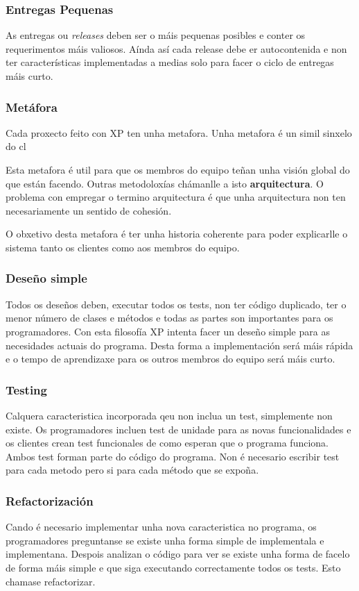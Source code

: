 \subsubsection{Entregas Pequenas}
As entregas ou \emph{releases} deben ser o máis pequenas posibles e conter os requerimentos máis valiosos. Aínda así cada release debe er autocontenida e non ter características implementadas a medias solo para facer o ciclo de entregas máis curto.

\subsubsection{Metáfora}
Cada proxecto feito con XP ten unha metafora. Unha metafora é un simil sinxelo do cl

Esta metafora é util para que os membros do equipo teñan unha visión global do que están facendo. Outras metodoloxías chámanlle a isto \textbf{arquitectura}. O problema con empregar o termino arquitectura é que unha arquitectura non ten necesariamente un sentido de cohesión.

O obxetivo desta metafora é ter unha historia coherente para poder explicarlle o sistema tanto os clientes como aos membros do equipo.

\subsubsection{Deseño simple}
Todos os deseños deben, executar todos os tests, non ter código duplicado, ter o menor número de clases e métodos e todas as partes son importantes para os programadores. Con esta filosofía XP intenta facer un deseño simple para as necesidades actuais do programa. Desta forma a implementación será máis rápida e o tempo de aprendizaxe para os outros membros do equipo será máis curto.

\subsubsection{Testing}
Calquera caracteristica incorporada qeu non inclua un test, simplemente non existe. Os programadores incluen test de unidade para as novas funcionalidades e os clientes crean test funcionales de como esperan que o programa funciona. Ambos test forman parte do código do programa. Non é necesario escribir test para cada metodo pero si para cada método que se expoña.

\subsubsection{Refactorización}
Cando é necesario implementar unha nova caracteristica no programa, os programadores preguntanse se existe unha forma simple de implementala e implementana. Despois analizan o código para ver se existe unha forma de facelo de forma máis simple e que siga executando correctamente todos os tests. Esto chamase refactorizar.

